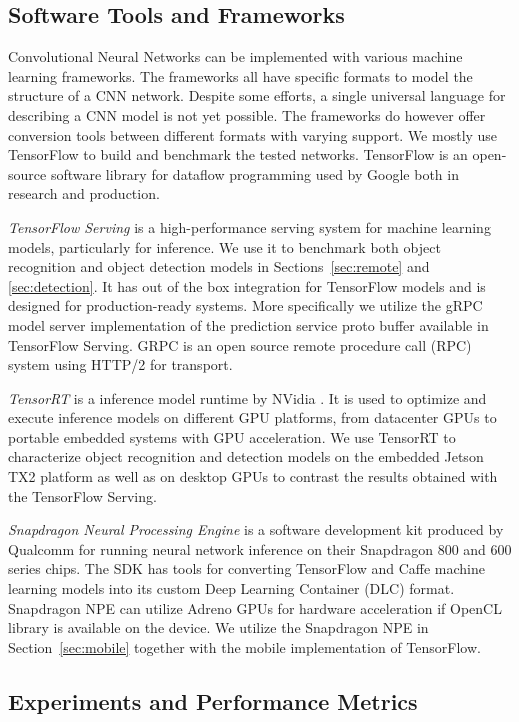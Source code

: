 \documentclass[sigconf]{acmart}
\begin{document}
\subsection{Software Tools and Frameworks}

Convolutional Neural Networks can be implemented with various machine learning frameworks. The frameworks all have specific formats to model the structure of a CNN network. Despite some efforts, a single universal language for describing a CNN model is not yet possible. The frameworks do however offer conversion tools between different formats with varying support. We mostly use TensorFlow to build and benchmark the tested networks. TensorFlow is an open-source software library for dataflow programming used by Google both in research and production.

\textit{TensorFlow Serving} is a high-performance serving system for machine learning models, particularly for inference. We use it to benchmark both object recognition and object detection models in Sections~\ref{sec:remote} and \ref{sec:detection}. It has out of the box integration for TensorFlow models and is designed for production-ready systems. More specifically we utilize the gRPC model server implementation of the prediction service proto buffer available in TensorFlow Serving. GRPC is an open source remote procedure call (RPC) system using HTTP/2 for transport.

\textit{TensorRT} is a inference model runtime by NVidia \cite{tensorrt}. It is used to optimize and execute inference models on different GPU platforms, from datacenter GPUs to portable embedded systems with GPU acceleration. We use TensorRT to characterize object recognition and detection models on the embedded Jetson TX2 platform as well as on desktop GPUs to contrast the results obtained with the TensorFlow Serving.

\textit{Snapdragon Neural Processing Engine}\cite{snpe} is a software development kit produced by Qualcomm for running neural network inference on their Snapdragon 800 and 600 series chips. The SDK has tools for converting TensorFlow and Caffe machine learning models into its custom Deep Learning Container (DLC) format. Snapdragon NPE can utilize Adreno GPUs for hardware acceleration if OpenCL library is available on the device. We utilize the Snapdragon NPE in Section~\ref{sec:mobile} together with the mobile implementation of TensorFlow.

\subsection{Experiments and Performance Metrics}
\end{document}
